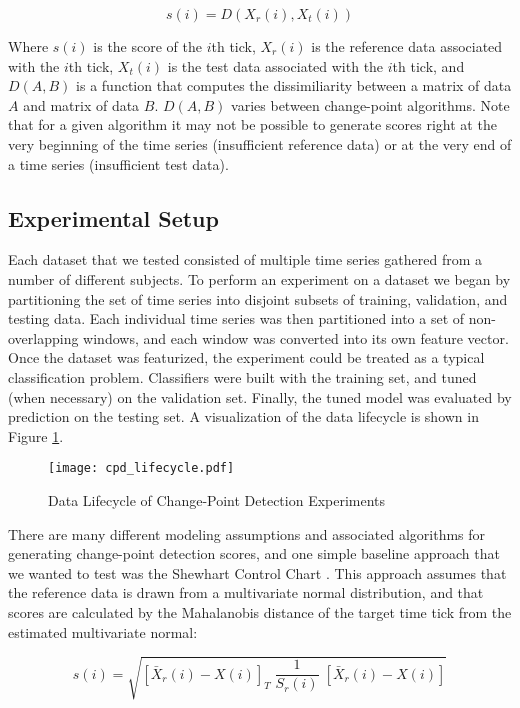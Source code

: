 \[
s(i) = D(X_r(i), X_t(i))
\]

Where $s(i)$ is the score of the $i$th tick, $X_r(i)$ is the reference
data associated with the $i$th tick, $X_t(i)$ is the test data
associated with the $i$th tick, and $D(A,B)$ is a function that computes the
dissimiliarity between a matrix of data $A$ and matrix of data $B$. $D(A,B)$
varies between change-point algorithms. Note that for a given
algorithm it may not be possible to generate scores right at the very beginning
of the time series (insufficient reference data) or at the very end of a time
series (insufficient test data).

\subsection{Experimental Setup}

Each dataset that we tested consisted of multiple time series gathered from
a number of different subjects. To perform an experiment on a dataset we
began by partitioning the set of time series into disjoint subsets of training,
validation, and testing data. Each individual time series was then partitioned
into a set of non-overlapping windows, and each window was converted into its
own feature vector. Once the dataset was featurized, the experiment could be
treated as a typical classification problem. Classifiers were built with the
training set, and tuned (when necessary) on the validation set. 
Finally, the tuned model was evaluated by prediction on the testing set.
A visualization of the data lifecycle is shown in Figure
\ref{fig:cpd_lifecycle}.
 
\begin{figure}
 \centering
 \texttt{[image: cpd\_lifecycle.pdf]}
 \caption{Data Lifecycle of Change-Point Detection Experiments}
 \label{fig:cpd_lifecycle}
\end{figure}

There are many different modeling assumptions and associated algorithms
for generating change-point detection scores, and one simple baseline approach
that we wanted to test was the Shewhart Control Chart \cite{shewhart26}.
This approach assumes that the reference data is drawn from a multivariate
normal distribution, and that scores are calculated by the Mahalanobis distance
of the target time tick from the estimated multivariate normal:

\[
s(i) = \sqrt{[\bar{X}_r(i) - X(i)]_T \; \frac{1}{S_r(i)} \; [\bar{X}_r(i) - X(i)]}
\]

